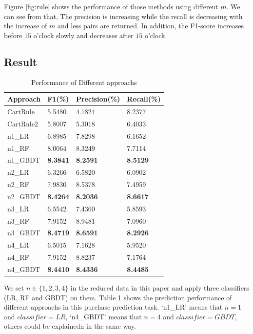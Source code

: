 \documentclass{llncs}
\begin{document}
Figure \ref{fig:rule} shows the performance of those methods using different $m$.
We can see from that,
The precision is increasing while the recall is decreasing
with the increase of $m$ and less pairs are returned.
In addition, the F1-score increases before $15$ o'clock slowly
and decreases after $15$ o'clock.

\subsection{Result}
\begin{table}[htbp]
	\normalsize
	\centering
	\caption{Performance of Different approachs}
	\begin{tabular}{|p{60pt}|p{60pt}|p{60pt}|p{60pt}|}
		\hline
		Approach & F1(\%) & Precision(\%) & Recall(\%) \\
		\hline
		CartRule & 5.5480 & 4.1824 & 8.2377 \\
		CartRule2 & 5.8007 & 5.3018 & 6.4033 \\
		\hline
		n1\_LR & 6.8985 & 7.8298 & 6.1652 \\
		n1\_RF & 8.0064 & 8.3249 & 7.7114 \\
		n1\_GBDT & \textbf{8.3841} & \textbf{8.2591} & \textbf{8.5129} \\
		\hline
		n2\_LR & 6.3266 & 6.5820 & 6.0902 \\
		n2\_RF & 7.9830 & 8.5378 & 7.4959 \\
		n2\_GBDT & \textbf{8.4264} & \textbf{8.2036} & \textbf{8.6617} \\
		\hline
		n3\_LR & 6.5542 & 7.4360 & 5.8593 \\
		n3\_RF & 7.9152 & 8.9481 & 7.0960 \\
		n3\_GBDT & \textbf{8.4719} & \textbf{8.6591} & \textbf{8.2926} \\
		\hline
		n4\_LR & 6.5015 & 7.1628 & 5.9520 \\
		n4\_RF & 7.9152 & 8.8237 & 7.1764 \\
		n4\_GBDT & \textbf{8.4410} & \textbf{8.4336} & \textbf{8.4485} \\
		\hline
	\end{tabular}
	\label{tab:score}
\end{table}

We set $n \in \{ 1, 2, 3, 4\}$ in the reduced data in this paper
and apply three classifiers (LR, RF and GBDT) on them.
Table \ref{tab:score} shows the prediction performance of different approachs
in this purchase prediction task.
`n1\_LR' means that $n = 1$ and $classifier = LR$,
`n4\_GBDT' means that $n = 4$ and $classifier = GBDT$,
others could be explainedn in the same way.
\end{document}
